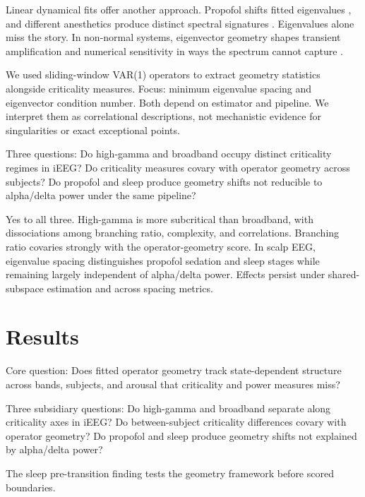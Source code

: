 \documentclass[preprint,12pt,nonatbib]{elsarticle}
\begin{document}
Linear dynamical fits offer another approach. Propofol shifts fitted eigenvalues \citep{Eisen2024,Eisen2026}, and different anesthetics produce distinct spectral signatures \citep{BerjagaBuisan2025,Davila2025}. Eigenvalues alone miss the story. In non-normal systems, eigenvector geometry shapes transient amplification and numerical sensitivity in ways the spectrum cannot capture \citep{Barzon2025,Galgali2023,Horrocks2024,Jarne2023,Stroud2024,Troude2025}.

We used sliding-window VAR(1) operators to extract geometry statistics alongside criticality measures. Focus: minimum eigenvalue spacing and eigenvector condition number. Both depend on estimator and pipeline. We interpret them as correlational descriptions, not mechanistic evidence for singularities or exact exceptional points.

Three questions: Do high-gamma and broadband occupy distinct criticality regimes in iEEG? Do criticality measures covary with operator geometry across subjects? Do propofol and sleep produce geometry shifts not reducible to alpha/delta power under the same pipeline?

Yes to all three. High-gamma is more subcritical than broadband, with dissociations among branching ratio, complexity, and correlations. Branching ratio covaries strongly with the operator-geometry score. In scalp EEG, eigenvalue spacing distinguishes propofol sedation and sleep stages while remaining largely independent of alpha/delta power. Effects persist under shared-subspace estimation and across spacing metrics.

\section{Results}

Core question: Does fitted operator geometry track state-dependent structure across bands, subjects, and arousal that criticality and power measures miss?

Three subsidiary questions: Do high-gamma and broadband separate along criticality axes in iEEG? Do between-subject criticality differences covary with operator geometry? Do propofol and sleep produce geometry shifts not explained by alpha/delta power?

The sleep pre-transition finding tests the geometry framework before scored boundaries.
\end{document}
